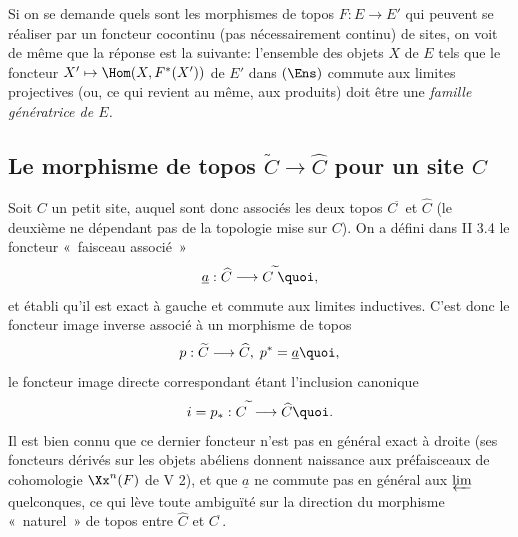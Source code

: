 \documentclass[10pt]{../fichiers-configuration-latex/smfart}
\begin{document}
\subsubsection{}
Si on se demande quels sont les morphismes de topos $F:E\rightarrow
E'$ qui peuvent se réaliser par un foncteur cocontinu (pas
nécessairement continu) de sites, on voit de même que la
réponse est la suivante: l'ensemble des objets $X$ de $E$ tels que
le foncteur $X'\mapsto \Hom(X,F^{\ast}(X'))$ de $E'$ dans $(\Ens)$
commute aux limites projectives (ou, ce qui revient au même, aux
produits) doit être une \emph{famille génératrice de $E$.}

\subsection{Le morphisme de topos $\widetilde{C}\rightarrow
\widehat{C}$ pour un site $C$}

Soit $C$ un petit site, auquel sont donc associés les deux topos
$C^{\widetilde{\phantom{,}}}$ et $\widehat{C}$ (le deuxième ne
dépendant pas de la topologie mise sur $C$). On a défini dans II
3.4 le foncteur « faisceau associé »
$$
\underline{a}:\widehat{C}\longrightarrow
C^{\widetilde{\phantom{,}}}{\quoi},
$$
et établi qu'il est exact à gauche et commute aux limites
inductives. C'est donc le foncteur image inverse associé à un
morphisme de topos
$$
p:\widetilde{C}\longrightarrow \widehat{C},\;
p^{\ast}=\underline{a}{\quoi},
$$
le foncteur image directe correspondant étant l'inclusion
canonique
$$
i=p_{\ast}:C^{\widetilde{\phantom{,}}}\longrightarrow
\widehat{C}{\quoi}.
$$
Il est bien connu que ce dernier foncteur n'est pas en général exact
à droite (ses foncteurs dérivés sur les objets abéliens donnent
naissance aux préfaisceaux de cohomologie $\Xx^n(F)$ de V 2), et que
$\underline{a}$ ne commute pas en général aux $\varprojlim$ quelconques,
ce qui lève toute ambiguïté sur la direction du morphisme « naturel »  de topos entre $\widehat{C}$ et
$C^{\widetilde{\phantom{,}}}$.
\end{document}
